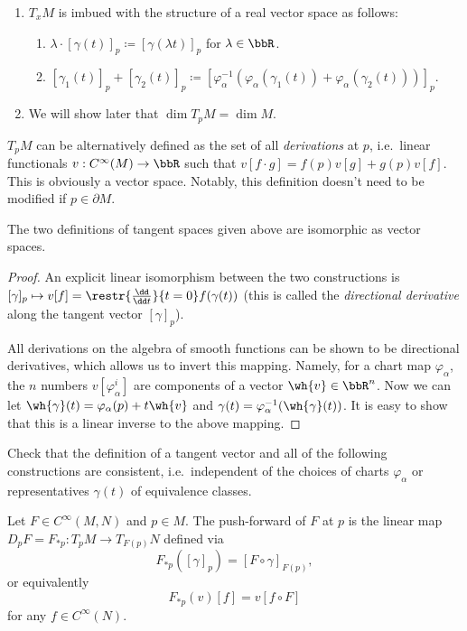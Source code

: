\begin{enumerate}
    \item $T_x M$ is imbued with the structure of a real vector space as follows:
    \begin{enumerate}
        \item $\lambda\cdot [\gamma(t)]_p\coloneqq [\gamma(\lambda t)]_p$ for $\lambda\in\bbR $.
        \item $[\gamma_1(t)]_p+[\gamma_2(t)]_p\coloneqq [\varphi_\alpha^{-1}(\varphi_\alpha(\gamma_1(t))+\varphi_\alpha(\gamma_2(t)))]_p.$
    \end{enumerate}
    \item We will show later that $\dim T_p M=\dim M$.
\end{enumerate}


\begin{defn}
$T_p M$ can be alternatively defined as the set of all \emph{derivations} at $p$, i.e.\ linear functionals $v:C^\infty(M)\to \bbR $ such that $v[f\cdot g]=f(p)v[g]+g(p)v[f]$. This is obviously a vector space. Notably, this definition doesn't need to be modified if $p\in\partial M$.
\end{defn}

\begin{prop}
The two definitions of tangent spaces given above are isomorphic as vector spaces.
\end{prop}
\begin{proof}
An explicit linear isomorphism between the two constructions is $[\gamma]_p\mapsto v[f]=\restr{\frac{\dd}{\dd t}}{t=0}f(\gamma(t))$ (this is called the \emph{directional derivative} along the tangent vector $[\gamma]_p$). 

All derivations on the algebra of smooth functions can be shown to be directional derivatives, which allows us to invert this mapping. Namely, for a chart map $\varphi_\alpha$, the $n$ numbers $v[\varphi_\alpha^i]$ are components of a vector $\wh{v}\in \bbR^n$. Now we can let $\wh{\gamma}(t)=\varphi_\alpha(p)+t\wh{v}$ and $\gamma(t)=\varphi_\alpha^{-1}(\wh{\gamma}(t))$. It is easy to show that this is a linear inverse to the above mapping.
\end{proof}


\begin{xca}
Check that the definition of a tangent vector and all of the following constructions are consistent, i.e.\ independent of the choices of charts $\varphi_\alpha$ or representatives $\gamma(t)$ of equivalence classes.
\end{xca}
\begin{defn}
Let $F\in C^\infty(M,N)$ and $p\in M$. The push-forward of $F$ at $p$ is the linear map $D_p F=F_{\ast p}:T_p M\to T_{F(p)} N$ defined via \[F_{\ast p}([\gamma]_p)=[F\circ\gamma]_{F(p)},\] or equivalently \[F_{\ast p}(v)[f]=v[f\circ F]\] for any $f\in C^\infty (N)$.
\end{defn}

